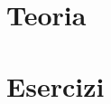 \documentclass[10pt,a4paper,twoside]{book}
\begin{document}


\AtEndDocument{\cleardoublepage}


\mainmatter
\pagestyle{fancy} %


\part{Teoria}


\part{Esercizi}

\end{document}
